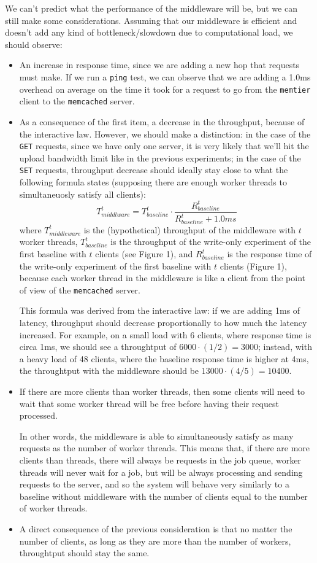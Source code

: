 \documentclass[11pt,a4paper]{article}
\renewcommand{\t}[1]{%
	{\texttt{#1}}}
\begin{document}
We can't predict what the performance of the middleware will be, but we can still make some 
considerations. Assuming that our middleware is efficient and doesn't add any kind of 
bottleneck/slowdown due to computational load, we should observe:
\begin{itemize} %
	\item An increase in response time, since we are adding a new hop that requests must make. 
		If we run a \t{ping} test, we can observe that we are adding a 1.0ms overhead on average
		on the time it took for a request to go from the \t{memtier} client to the \t{memcached}
		server.
	\item As a consequence of the first item, a decrease in the throughput, because of the interactive law.
		However, we should make a distinction: in the case of the \t{GET} requests, since we have only one server,
		it is very likely that we'll hit the upload bandwidth limit like in the previous experiments; in the case
		of the \t{SET} requests, throughput decrease should ideally stay close to what the following formula states (supposing there are enough worker threads to simultaneuosly satisfy all clients):
		$$
		T_{middlware}^t = T_{baseline}^t \cdot \frac{R_{baseline}^t}{R_{baseline}^t + 1.0ms}
		$$
		where $T_{middleware}^t$ is the (hypothetical) throughput of the
		middleware with $t$ worker threads, $T_{baseline}^t$ is the throughput
		of the write-only experiment of the first baseline with $t$ clients
		(see Figure 1), and $R_{baseline}^t$ is the response time of the
		write-only experiment of the first baseline with $t$ clients (Figure
		1), because each worker thread in the middleware is like 
		a client from the point of view of the \t{memcached} server.\par
		This formula was derived from the interactive law: if we are adding 1ms
		of latency, throughput should decrease proportionally to how much the
		latency increased. For example, on a small load with 6 clients, where
		response time is circa 1ms, we should see a throughtput of $6000 \cdot
		(1/2) = 3000$; instead, with a heavy load of 48 clients, where the
		baseline response time is higher at 4ms, the throughtput with the
		middleware should be $13000 \cdot (4/5) = 10400$.
	\item If there are more clients than worker threads, 
		then some clients will need to wait that some worker
		thread will be free before having their request processed.\par In other
		words, the middleware is able to simultaneously satisfy as many
		requests as the number of worker threads.  This means that, if there
		are more clients than threads, there will always be requests in the job
		queue, worker threads will never wait for a job, but will be always
		processing and sending requests to the server, and so
		the system will behave very similarly to a baseline without middleware
		with the number of clients equal to the number of worker threads. 
	\item A direct consequence of the previous consideration  is that no matter
		the number of clients, as long as they are more than the number of
		workers, throughtput should stay the same.



\end{itemize}
\end{document}
